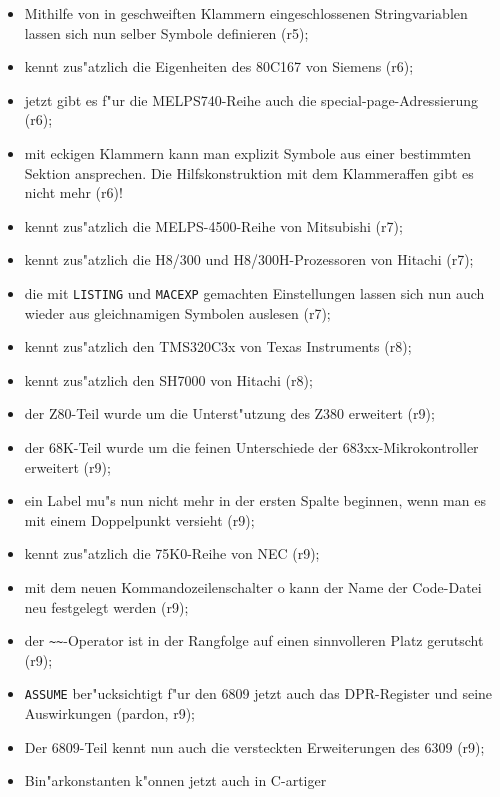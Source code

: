 \documentclass[12pt,a4paper,twoside]{report}
\newcommand{\tty}[1]{{\tt #1}}
\begin{document}
\begin{itemize}
{\begin{itemize}
{            zu k"onnen (r5);}
      \item{Mithilfe von in geschweiften Klammern eingeschlossenen
            Stringvariablen lassen sich nun selber Symbole definieren
            (r5);}
      \item{kennt zus"atzlich die Eigenheiten des 80C167 von Siemens (r6);}
      \item{jetzt gibt es f"ur die MELPS740-Reihe auch die
            special-page-Adressierung (r6);}
      \item{mit eckigen Klammern kann man explizit Symbole aus einer
            bestimmten Sektion ansprechen.  Die Hilfskonstruktion mit dem
            Klammeraffen gibt es nicht mehr (r6)!}
      \item{kennt zus"atzlich die MELPS-4500-Reihe von Mitsubishi (r7);}
      \item{kennt zus"atzlich die H8/300 und H8/300H-Prozessoren von
            Hitachi (r7);}
      \item{die mit \tty{LISTING} und \tty{MACEXP} gemachten Einstellungen
            lassen sich nun auch wieder aus gleichnamigen Symbolen auslesen
            (r7);}
      \item{kennt zus"atzlich den TMS320C3x von Texas Instruments (r8);}
      \item{kennt zus"atzlich den SH7000 von Hitachi (r8);}
      \item{der Z80-Teil wurde um die Unterst"utzung des Z380 erweitert (r9);}
      \item{der 68K-Teil wurde um die feinen Unterschiede der
            683xx-Mikrokontroller erweitert (r9);}
      \item{ein Label mu"s nun nicht mehr in der ersten Spalte beginnen,
            wenn man es mit einem Doppelpunkt versieht (r9);}
      \item{kennt zus"atzlich die 75K0-Reihe von NEC (r9);}
      \item{mit dem neuen Kommandozeilenschalter o kann der Name
            der Code-Datei neu festgelegt werden (r9);}
      \item{der \verb!~~!-Operator ist in der Rangfolge auf einen
            sinnvolleren Platz gerutscht (r9);}
      \item{\tty{ASSUME} ber"ucksichtigt f"ur den 6809 jetzt auch das
            DPR-Register und seine Auswirkungen (pardon, r9);}
      \item{Der 6809-Teil kennt nun auch die versteckten
            Erweiterungen des 6309 (r9);}
      \item{Bin"arkonstanten k"onnen jetzt auch in C-artiger
}
\end{itemize}}
\end{itemize}
\end{document}
